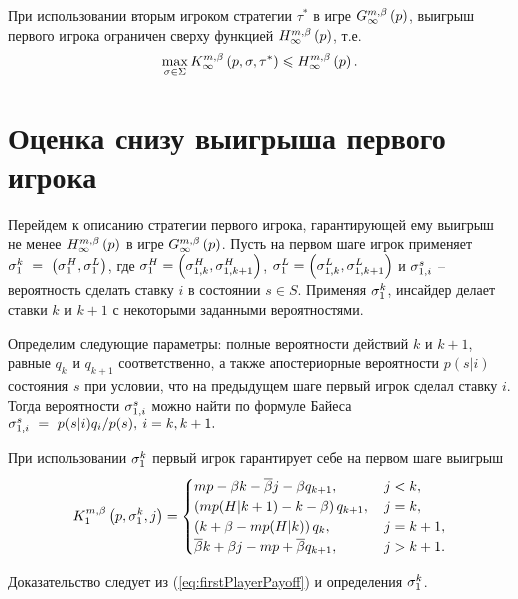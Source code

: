 \begin{lemma}
  \label{lemma:upperBound}
  При использовании вторым игроком стратегии $\tau^*$ в игре
  $\infiniteGame{p}$\textup{,} выигрыш первого игрока ограничен сверху функцией
  $\upperBound{p}$, т.е.
  \[
    \max_{\sigma \in \Sigma} \infiniteFirstPlayerPayoff{p}{\sigma}{\tau^*} \leq
    \upperBound{p}.
  \]
\end{lemma}

\section{Оценка снизу выигрыша первого игрока}
Перейдем к описанию стратегии первого игрока, гарантирующей ему выигрыш не менее
$\upperBound{p}$ в игре $\infiniteGame{p}$. Пусть на первом шаге игрок применяет
$ \fGeneral{k}~=~\left(\fGeneral{H}, \fGeneral{L}\right) $, где $\fGeneral{H} =
\left(\fGeneral[1,k]{H}, \fGeneral[1,k+1]{H}\right)$, $\fGeneral{L} =
\left(\fGeneral[1,k]{L}, \fGeneral[1,k+1]{L}\right)$ и $\fGeneral[1,i]{s}$ --
вероятность сделать ставку $i$ в состоянии $s \in S$. Применяя
$\fGeneral{k}$, инсайдер делает ставки $k$ и $k+1$ с некоторыми заданными
вероятностями.

Определим следующие параметры: полные вероятности действий $k$ и $k+1$, равные
$q_k$ и $q_{k+1}$ соответственно, а также апостериорные вероятности $p(s|i)$
состояния $s$ при условии, что на предыдущем шаге первый игрок сделал ставку
$i$. Тогда вероятности $\fGeneral[1,i]{s}$ можно найти по формуле Байеса $
\fGeneral[1,i]{s}~=~p(s|i)q_i/p(s), \: i = k, k + 1. $

\begin{proposition}
  При использовании $\fGeneral{k}$ первый игрок гарантирует себе на первом шаге
  выигрыш
  \begin{equation}
    \label{eq:lowerPayoffGeneral}
    \firstPlayerPayoff{1}{p}{\fGeneral{k}}{j} =
    \begin{cases}
      mp - \Co k - \DCo j - \Co q_{k+1},      & \, j < k,     \\
      \left(m p(H|k+1) - k - \Co \right) q_{k+1}, & \, j = k,     \\
      \left(k + \Co - m p(H|k) \right) q_k,       & \, j = k + 1, \\
      \DCo k + \Co j - mp + \DCo q_{k+1}, & \, j > k + 1.
    \end{cases}
  \end{equation}
\end{proposition}

Доказательство следует из (\ref{eq:firstPlayerPayoff}) и определения
$\fGeneral{k}$.

